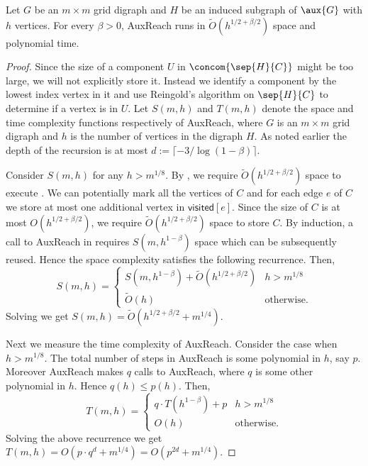 \documentclass{toc}
\begin{document}
\begin{lemma}
Let $G$ be an $m \times m$ grid %
digraph %
 and $H$ be%
an%
induced subgraph of $\aux{G}$ with $h$ vertices. For every $\beta > 0$, \textsf{AuxReach} runs in $\widetilde{O}({h}^{1/2 + \beta/2})$ space and polynomial time.
\end{lemma}
\begin{proof}
  Since the size of a component $U$ in $\concom{\sep{H}{C}}$ might be too large, we will not explicitly store it. Instead we identify a component by the lowest index vertex %
 in it and use Reingold's algorithm on $\sep{H}{C}$ to determine if a vertex is %
 in $U$. Let $S(m,h)$ and $T(m,h)$ denote the space and time complexity functions respectively of \textsf{AuxReach}, where $G$ is an $m \times m$ grid %
digraph %
 and $h$ is the number of vertices in the %
digraph %
 $H$. As noted earlier the depth of the recursion is at most 
%
$d:= \lceil -3/\log(1-\beta)\rceil$. %

Consider $S(m,h)$ for any $h > m^{1/8}$. By , we require $\widetilde{O}(h^{1/2 + \beta/2})$ space to execute . We can potentially mark all the vertices of $C$ and for each edge $e$ of $C$ we store at most one additional vertex in $\textsf{visited}[e]$. Since the size of $C$ is at most $O(h^{1/2 + \beta/2})$, we require $\widetilde{O}(h^{1/2 + \beta/2})$ space to store $C$. By induction, a call to \textsf{AuxReach} in   requires $S(m, h^{1 - \beta})$ space which can be subsequently reused. Hence the space complexity satisfies the following recurrence. Then,
\[S(m,h) =
\begin{cases}
S(m, h^{1 - \beta}) + \widetilde{O}(h^{1/2 + \beta/2}) & h > m^{1/8}\\
\widetilde{O}(h) & \textrm{otherwise}.
\end{cases}\]
Solving we get $S(m,h) = \widetilde{O}(h^{1/2 + \beta/2} + m^{1/4})$.

Next we measure the time complexity of \textsf{AuxReach}. Consider the case when $h > m^{1/8}$. The total number of steps in \textsf{AuxReach} is some polynomial in $h$, say $p$. Moreover \textsf{AuxReach} makes $q$ calls to \textsf{AuxReach}, where $q$ is some other polynomial in $h$. Hence $q(h) \leq p(h)$. Then,
\[T(m,h) =
\begin{cases}
q\cdot T(h^{1 - \beta}) + p & h > m^{1/8} \\
O(h) & \textrm{otherwise}.
\end{cases} \]
Solving the above recurrence we get $T(m,h) = O(p\cdot q^d + m^{1/4}) = O(p^{2d} + m^{1/4})$.
\end{proof}
\end{document}
